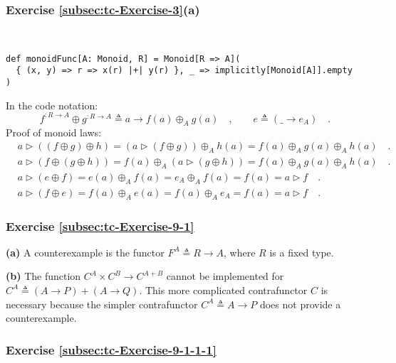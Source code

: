 \subsubsection*{Exercise \ref{subsec:tc-Exercise-3}(a)}

~
\begin{lstlisting}
def monoidFunc[A: Monoid, R] = Monoid[R => A](
  { (x, y) => r => x(r) |+| y(r) }, _ => implicitly[Monoid[A]].empty
)
\end{lstlisting}

In the code notation:
\[
f^{:R\rightarrow A}\oplus g^{:R\rightarrow A}\triangleq a\rightarrow f(a)\oplus_{A}g(a)\quad,\quad\quad e\triangleq(\_\rightarrow e_{A})\quad.
\]
Proof of monoid laws:
\begin{align*}
 & a\triangleright\left(\left(f\oplus g\right)\oplus h\right)=\left(a\triangleright(f\oplus g)\right)\oplus_{A}h(a)=f(a)\oplus_{A}g(a)\oplus_{A}h(a)\quad.\\
 & a\triangleright\left(f\oplus\left(g\oplus h\right)\right)=f(a)\oplus_{A}\left(a\triangleright(g\oplus h)\right)=f(a)\oplus_{A}g(a)\oplus_{A}h(a)\quad.\\
 & a\triangleright\left(e\oplus f\right)=e(a)\oplus_{A}f(a)=e_{A}\oplus_{A}f(a)=f(a)=a\triangleright f\quad.\\
 & a\triangleright(f\oplus e)=f(a)\oplus_{A}e(a)=f(a)\oplus_{A}e_{A}=f(a)=a\triangleright f\quad.
\end{align*}


\subsubsection*{Exercise \ref{subsec:tc-Exercise-9-1} }

\textbf{(a)} A counterexample is the functor $F^{A}\triangleq R\rightarrow A$,
where $R$ is a fixed type.

\textbf{(b)} The function $C^{A}\times C^{B}\rightarrow C^{A+B}$
cannot be implemented for $C^{A}\triangleq\left(A\rightarrow P\right)+\left(A\rightarrow Q\right)$.
This more complicated contrafunctor $C$ is necessary because the
simpler contrafunctor $C^{A}\triangleq A\rightarrow P$ does not provide
a counterexample.

\subsubsection*{Exercise \ref{subsec:tc-Exercise-9-1-1-1}}


